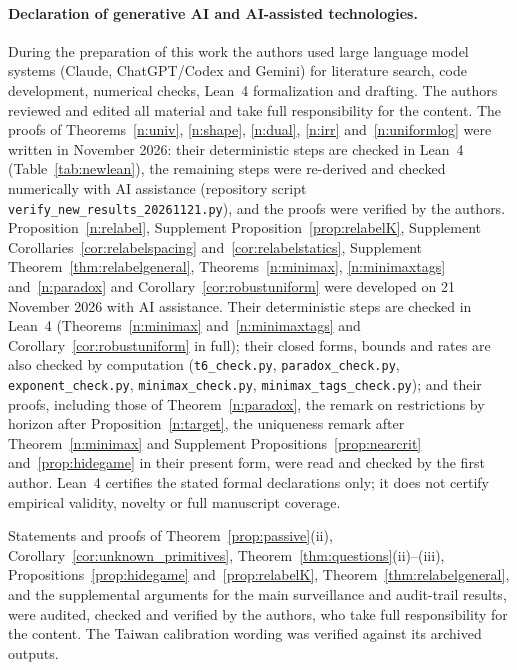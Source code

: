 \documentclass[12pt]{article}
\theoremstyle{definition}
\theoremstyle{remark}
\begin{document}
\paragraph{Declaration of generative AI and AI-assisted technologies.} During the preparation of this work the authors used large language model systems (Claude, ChatGPT/Codex and Gemini) for literature search, code development, numerical checks, Lean~4 formalization and drafting. The authors reviewed and edited all material and take full responsibility for the content. The proofs of Theorems~\ref{n:univ}, \ref{n:shape}, \ref{n:dual}, \ref{n:irr} and~\ref{n:uniformlog} were written in November 2026: their deterministic steps are checked in Lean~4 (Table~\ref{tab:newlean}), the remaining steps were re-derived and checked numerically with AI assistance (repository script \texttt{verify\_new\_results\_20261121.py}), and the proofs were verified by the authors. Proposition~\ref{n:relabel}, Supplement Proposition~\ref{prop:relabelK}, Supplement Corollaries~\ref{cor:relabelspacing} and~\ref{cor:relabelstatics}, Supplement Theorem~\ref{thm:relabelgeneral}, Theorems~\ref{n:minimax}, \ref{n:minimaxtags} and~\ref{n:paradox} and Corollary~\ref{cor:robustuniform} were developed on 21 November 2026 with AI assistance. Their deterministic steps are checked in Lean~4 (Theorems~\ref{n:minimax} and~\ref{n:minimaxtags} and Corollary~\ref{cor:robustuniform} in full); their closed forms, bounds and rates are also checked by computation (\texttt{t6\_check.py}, \texttt{paradox\_check.py}, \texttt{exponent\_check.py}, \texttt{minimax\_check.py}, \texttt{minimax\_tags\_check.py}); and their proofs, including those of Theorem~\ref{n:paradox}, the remark on restrictions by horizon after Proposition~\ref{n:target}, the uniqueness remark after Theorem~\ref{n:minimax} and Supplement Propositions~\ref{prop:nearcrit} and~\ref{prop:hidegame} in their present form, were read and checked by the first author. Lean~4 certifies the stated formal declarations only; it does not certify empirical validity, novelty or full manuscript coverage.

 Statements and proofs of Theorem~\ref{prop:passive}(ii), Corollary~\ref{cor:unknown_primitives}, Theorem~\ref{thm:questions}(ii)--(iii), Propositions~\ref{prop:hidegame} and~\ref{prop:relabelK}, Theorem~\ref{thm:relabelgeneral}, and the supplemental arguments for the main surveillance and audit-trail results, were audited, checked and verified by the authors, who take full responsibility for the content. The Taiwan calibration wording was verified against its archived outputs.
\end{document}
